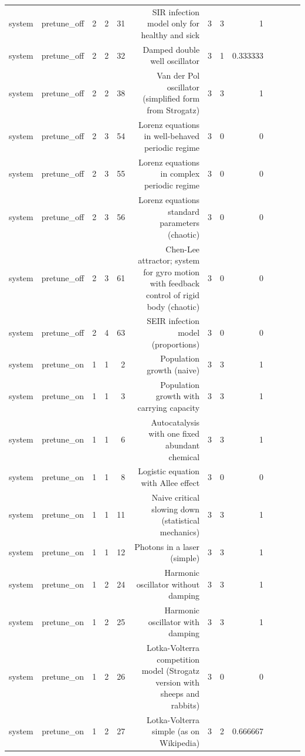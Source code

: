 \begin{table}[htbp]
\begin{tabular}{lrrrrrrrrrrrr}
system & pretune\_off & 2 & 2 & 31 & SIR infection model only for healthy and sick & 3 & 3 & 1 &  &  &  &  \\
system & pretune\_off & 2 & 2 & 32 & Damped double well oscillator & 3 & 1 & 0.333333 &  &  &  &  \\
system & pretune\_off & 2 & 2 & 38 & Van der Pol oscillator (simplified form from Strogatz) & 3 & 3 & 1 &  &  &  &  \\
system & pretune\_off & 2 & 3 & 54 & Lorenz equations in well-behaved periodic regime & 3 & 0 & 0 &  &  &  &  \\
system & pretune\_off & 2 & 3 & 55 & Lorenz equations in complex periodic regime & 3 & 0 & 0 &  &  &  &  \\
system & pretune\_off & 2 & 3 & 56 & Lorenz equations standard parameters (chaotic) & 3 & 0 & 0 &  &  &  &  \\
system & pretune\_off & 2 & 3 & 61 & Chen-Lee attractor; system for gyro motion with feedback control of rigid body (chaotic) & 3 & 0 & 0 &  &  &  &  \\
system & pretune\_off & 2 & 4 & 63 & SEIR infection model (proportions) & 3 & 0 & 0 &  &  &  &  \\
system & pretune\_on & 1 & 1 & 2 & Population growth (naive) & 3 & 3 & 1 &  &  &  &  \\
system & pretune\_on & 1 & 1 & 3 & Population growth with carrying capacity & 3 & 3 & 1 &  &  &  &  \\
system & pretune\_on & 1 & 1 & 6 & Autocatalysis with one fixed abundant chemical & 3 & 3 & 1 &  &  &  &  \\
system & pretune\_on & 1 & 1 & 8 & Logistic equation with Allee effect & 3 & 0 & 0 &  &  &  &  \\
system & pretune\_on & 1 & 1 & 11 & Naive critical slowing down (statistical mechanics) & 3 & 3 & 1 &  &  &  &  \\
system & pretune\_on & 1 & 1 & 12 & Photons in a laser (simple) & 3 & 3 & 1 &  &  &  &  \\
system & pretune\_on & 1 & 2 & 24 & Harmonic oscillator without damping & 3 & 3 & 1 &  &  &  &  \\
system & pretune\_on & 1 & 2 & 25 & Harmonic oscillator with damping & 3 & 3 & 1 &  &  &  &  \\
system & pretune\_on & 1 & 2 & 26 & Lotka-Volterra competition model (Strogatz version with sheeps and rabbits) & 3 & 0 & 0 &  &  &  &  \\
system & pretune\_on & 1 & 2 & 27 & Lotka-Volterra simple (as on Wikipedia) & 3 & 2 & 0.666667 &  &  &  &  \\

\end{tabular}
\end{table}
